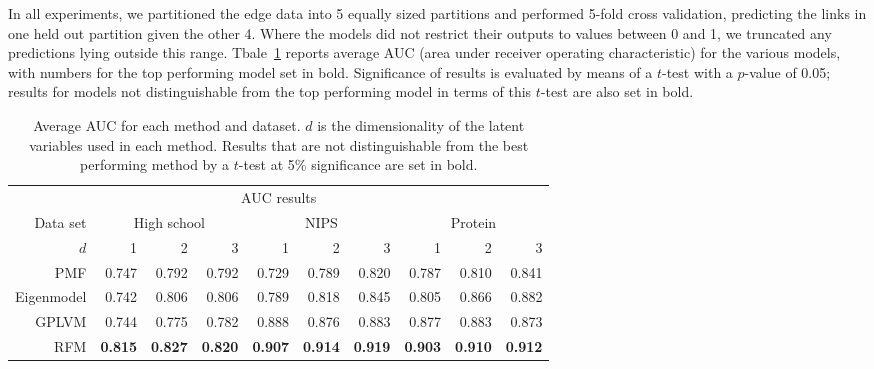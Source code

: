In all experiments, we partitioned the edge data into 5 equally sized partitions and performed 5-fold cross validation, predicting the links in one held out partition given the other 4. 
Where the models did not restrict their outputs to values between 0 and 1, we truncated any predictions lying outside this range.
Tbale~\ref{table:networks:AUCs} reports average AUC (area under receiver operating characteristic) for the various models, with numbers for the top performing model set in bold.
Significance of results is evaluated by means of a $t$-test with a $p$-value of 0.05; results for models not distinguishable from the top performing model in terms of this $t$-test are also set in bold.

\begin{table}
\begin{center}
  \begin{tabular}{r | r r r | r r r | r r r}
    \multicolumn{10}{c}{AUC results} \\
    \addlinespace[2pt]
    Data set & \multicolumn{3}{c|}{High school} & \multicolumn{3}{c|}{NIPS} & \multicolumn{3}{c}{Protein} \\
    $d$ & 1 & 2 & 3 & 1 & 2 & 3 & 1 & 2 & 3 \\
    \midrule
    PMF                   & 0.747 & 0.792 & 0.792 & 0.729 & 0.789 & 0.820 & 0.787 & 0.810 & 0.841 \\
    Eigenmodel            & 0.742 & 0.806 & 0.806 & 0.789 & 0.818 & 0.845 & 0.805 & 0.866 & 0.882 \\
    GPLVM                 & 0.744 & 0.775 & 0.782 & 0.888 & 0.876 & 0.883 & 0.877 & 0.883 & 0.873 \\
    RFM & \textbf{0.815} & \textbf{0.827} & \textbf{0.820} & \textbf{0.907} & \textbf{0.914} & \textbf{0.919} & \textbf{0.903} & \textbf{0.910} & \textbf{0.912}
  \end{tabular}
\end{center}
  \caption[AUCs in link prediction experiment.]{Average AUC for each method and dataset. $d$ is the dimensionality of the latent variables used in each method. Results that are not distinguishable from the best performing method by a $t$-test at 5\% significance are set in bold.}
  \label{table:networks:AUCs}
\end{table}

